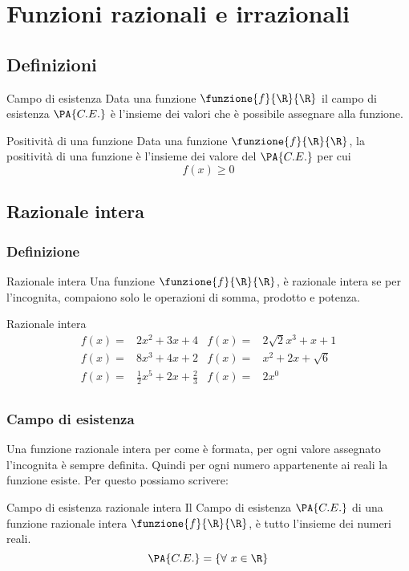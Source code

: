 \chapter{Funzioni razionali e irrazionali}
\section{Definizioni}
\begin{definizionet}{Campo di esistenza}{}
Data una funzione $\funzione{f}{\R}{\R}$ il campo di esistenza $\PA{C.E.}$ è l'insieme dei valori che è possibile assegnare alla funzione.
\end{definizionet}
\begin{definizionet}{Positività di una funzione}{}
	Data una funzione $\funzione{f}{\R}{\R}$, la positività di una funzione è l'insieme dei valore del $\PA{C.E.}$ per cui\[f(x)\geq 0 \]
\end{definizionet}
\section{Razionale intera}
\subsection{Definizione}
\begin{definizionet}{Razionale intera}{}
Una funzione $\funzione{f}{\R}{\R}$,  è  razionale intera se per l'incognita,  compaiono solo le operazioni di somma, prodotto e potenza.
\end{definizionet}
\begin{esempiot}{Razionale intera}{}
	\begin{align*}
	f(x)=&2x^2+3x+4&f(x)=&2\sqrt{2}x^3+x+1\\
		f(x)=&8x^3+4x+2&f(x)=&x^2+2x+\sqrt{6}\\
		f(x)=&\frac{1}{2}x^5+2x+\frac{2}{3}&f(x)=&2x^0\\
	\end{align*}
\end{esempiot}
\subsection{Campo di esistenza}
Una funzione razionale intera per come è formata, per ogni valore assegnato l'incognita è sempre  definita. Quindi per ogni numero appartenente ai reali la funzione esiste. Per questo possiamo scrivere:
\begin{definizionet}{Campo di esistenza razionale intera}{}
Il Campo di esistenza $\PA{C.E.}$ di una funzione razionale intera $\funzione{f}{\R}{\R}$, è tutto l'insieme dei numeri reali.
\[\PA{C.E.}=\lbrace\forall\ x\in\R\rbrace\]
\end{definizionet} 
